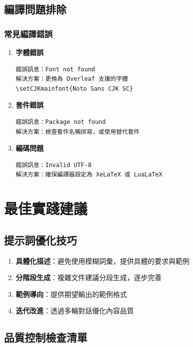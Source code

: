 \documentclass[12pt,a4paper]{article}
\begin{document}
\subsection{編譯問題排除}

\subsubsection{常見編譯錯誤}

\begin{enumerate}
    \item \textbf{字體錯誤}
    \begin{lstlisting}[language=bash]
錯誤訊息：Font not found
解決方案：更換為 Overleaf 支援的字體
\setCJKmainfont{Noto Sans CJK SC}
    \end{lstlisting}

    \item \textbf{套件錯誤}
    \begin{lstlisting}[language=bash]
錯誤訊息：Package not found
解決方案：檢查套件名稱拼寫，或使用替代套件
    \end{lstlisting}

    \item \textbf{編碼問題}
    \begin{lstlisting}[language=bash]
錯誤訊息：Invalid UTF-8
解決方案：確保編譯器設定為 XeLaTeX 或 LuaLaTeX
    \end{lstlisting}
\end{enumerate}

\section{最佳實踐建議}

\subsection{提示詞優化技巧}

\begin{enumerate}
    \item \textbf{具體化描述}：避免使用模糊詞彙，提供具體的要求與範例
    \item \textbf{分階段生成}：複雜文件建議分段生成，逐步完善
    \item \textbf{範例導向}：提供期望輸出的範例格式
    \item \textbf{迭代改進}：透過多輪對話優化內容品質
\end{enumerate}

\subsection{品質控制檢查清單}
\end{document}
